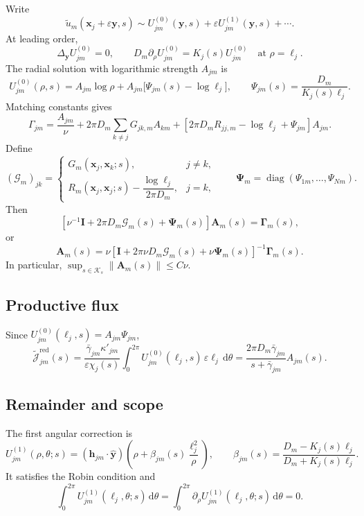 \documentclass[pdflatex,sn-mathphys-num]{sn-jnl}
\numberwithin{equation}{section}
\theoremstyle{thmstyleone}%
\theoremstyle{definition}
\theoremstyle{remark}
\begin{document}
\begin{appendices}
Write
\[
\widetilde u_m(\mathbf x_j+\varepsilon\mathbf y,s)
\sim U^{(0)}_{jm}(\mathbf y,s)+\varepsilon U^{(1)}_{jm}(\mathbf y,s)+\cdots.
\]
At leading order,
\[
\Delta_{\mathbf y}U^{(0)}_{jm}=0,\qquad
D_m\partial_\rho U^{(0)}_{jm}=K_j(s)U^{(0)}_{jm}
\quad\text{at }\rho=\ell_j.
\]
The radial solution with logarithmic strength $A_{jm}$ is
\[
U^{(0)}_{jm}(\rho,s)
=A_{jm}\log\rho+A_{jm}\bigl[\Psi_{jm}(s)-\log\ell_j\bigr],
\qquad
\Psi_{jm}(s)=\frac{D_m}{K_j(s)\ell_j}.
\]
Matching constants gives
\[
\Gamma_{jm}=\frac{A_{jm}}{\nu}
+2\pi D_m\sum_{k\ne j}G_{jk,m}A_{km}
+\left[2\pi D_mR_{jj,m}-\log\ell_j+\Psi_{jm}\right]A_{jm}.
\]
Define
\[
(\bm{\mathcal G}_m)_{jk}=
\begin{cases}
G_m(\mathbf x_j,\mathbf x_k;s),&j\ne k,\\[1mm]
R_m(\mathbf x_j,\mathbf x_j;s)
-\dfrac{\log\ell_j}{2\pi D_m},&j=k,
\end{cases}
\qquad
\bm\Psi_m=\operatorname{diag}(\Psi_{1m},\ldots,\Psi_{Nm}).
\]
Then
\begin{equation}
\left[\nu^{-1}\mathbf I+2\pi D_m\bm{\mathcal G}_m(s)
+\bm\Psi_m(s)\right]\mathbf A_m(s)=\bm\Gamma_m(s),
\label{eq:app_matching_system}
\end{equation}
or
\begin{equation}
\mathbf A_m(s)=\nu\left[
\mathbf I+2\pi\nu D_m\bm{\mathcal G}_m(s)+\nu\bm\Psi_m(s)
\right]^{-1}\bm\Gamma_m(s).
\label{eq:app_amplitude}
\end{equation}
In particular, $\sup_{s\in\mathcal K_s}\|\mathbf A_m(s)\|\leq C\nu$.

\subsection{Productive flux}

Since $U^{(0)}_{jm}(\ell_j,s)=A_{jm}\Psi_{jm}$,
\begin{equation}
\widetilde{\mathcal J}^{\mathrm{red}}_{jm}(s)
=\frac{\bar\gamma_{jm}\kappa'_{jm}}{\varepsilon\chi_j(s)}
\int_0^{2\pi}U^{(0)}_{jm}(\ell_j,s)\,
\varepsilon\ell_j\,\mathrm d\theta =\frac{2\pi D_m\bar\gamma_{jm}}{s+\bar\gamma_{jm}}A_{jm}(s).
\label{eq:app_reduced_flux}
\end{equation}

\subsection{Remainder and scope}

The first angular correction is
\begin{equation}
U^{(1)}_{jm}(\rho,\theta;s)
=(\mathbf h_{jm}\cdot\widehat{\mathbf y})
\left(\rho+\beta_{jm}(s)\frac{\ell_j^2}{\rho}\right),
\qquad
\beta_{jm}(s)=\frac{D_m-K_j(s)\ell_j}{D_m+K_j(s)\ell_j}.
\label{eq:app_dipole}
\end{equation}
It satisfies the Robin condition and
\begin{equation}
\int_0^{2\pi}U^{(1)}_{jm}(\ell_j,\theta;s)\,\mathrm d\theta
=\int_0^{2\pi}\partial_\rho U^{(1)}_{jm}(\ell_j,\theta;s)
\,\mathrm d\theta=0.
\label{eq:app_zero_dipole_flux}
\end{equation}


\end{appendices}
\end{document}
